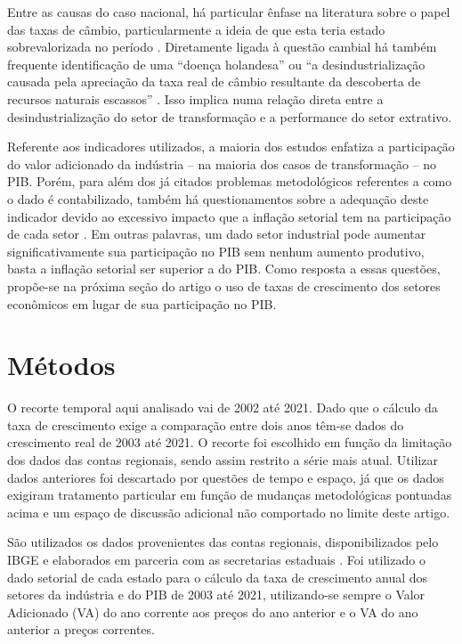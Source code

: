 Entre as causas do caso nacional, há particular ênfase na literatura
sobre o papel das taxas de câmbio, particularmente a ideia de que esta
teria estado sobrevalorizada no período
\citep{marconi_taxa_2012,oreiro_desindustrializacao_2010}. Diretamente ligada à questão cambial há
também frequente identificação de uma ``doença holandesa''
\citep{cunha_desindustrializacao_2013} ou ``a desindustrialização causada pela apreciação da
taxa real de câmbio resultante da descoberta de recursos naturais
escassos'' \citep[p.~222]{oreiro_desindustrializacao_2010}. Isso implica numa relação direta entre a
desindustrialização do setor de transformação e a performance do setor
extrativo.

Referente aos indicadores utilizados, a maioria dos estudos enfatiza a
participação do valor adicionado da indústria -- na maioria dos casos de
transformação -- no PIB. Porém, para além dos já citados problemas
metodológicos referentes a como o dado é contabilizado, também há
questionamentos sobre a adequação deste indicador devido ao excessivo
impacto que a inflação setorial tem na participação de cada setor
\citep{torres_uma_2015}. Em outras palavras, um dado setor industrial pode aumentar
significativamente sua participação no PIB sem nenhum aumento produtivo,
basta a inflação setorial ser superior a do PIB. Como resposta a essas
questões, propõe-se na próxima seção do artigo o uso de taxas de
crescimento dos setores econômicos em lugar de sua participação no PIB.

\section{Métodos}

O recorte temporal aqui analisado vai de 2002 até 2021. Dado que o
cálculo da taxa de crescimento exige a comparação entre dois anos têm-se
dados do crescimento real de 2003 até 2021. O recorte foi escolhido em
função da limitação dos dados das contas regionais, sendo assim restrito
a série mais atual. Utilizar dados anteriores foi descartado por
questões de tempo e espaço, já que os dados exigiram tratamento
particular em função de mudanças metodológicas pontuadas acima e um
espaço de discussão adicional não comportado no limite deste artigo.

São utilizados os dados provenientes das contas regionais,
disponibilizados pelo IBGE e elaborados em parceria com as secretarias
estaduais \citep{ibge_contas_nodate}. Foi utilizado o dado setorial de cada estado para o
cálculo da taxa de crescimento anual dos setores da indústria e do PIB
de 2003 até 2021, utilizando-se sempre o Valor Adicionado (VA) do ano
corrente aos preços do ano anterior e o VA do ano anterior a preços
correntes.

